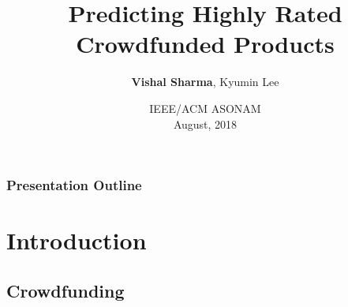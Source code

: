 \documentclass[9pt]{beamer}
\title[Predicting Highly Rated Crowdfunded Products]{Predicting Highly Rated Crowdfunded Products} %
\author[Vishal Sharma]{\textbf{Vishal Sharma}, Kyumin Lee}
\institute[USU] 
{
\small{Utah State University, Worcester Polytechnic Institute} \\ 
\small {USA}
}
\date{\footnotesize IEEE/ACM ASONAM \\ August, 2018}
\begin{document}
\begin{frame}
\titlepage %
\end{frame}



\begin{frame}
\frametitle{Presentation Outline} %
\tableofcontents %
\end{frame}








\section{Introduction}
\subsection{Crowdfunding}
\end{document}
